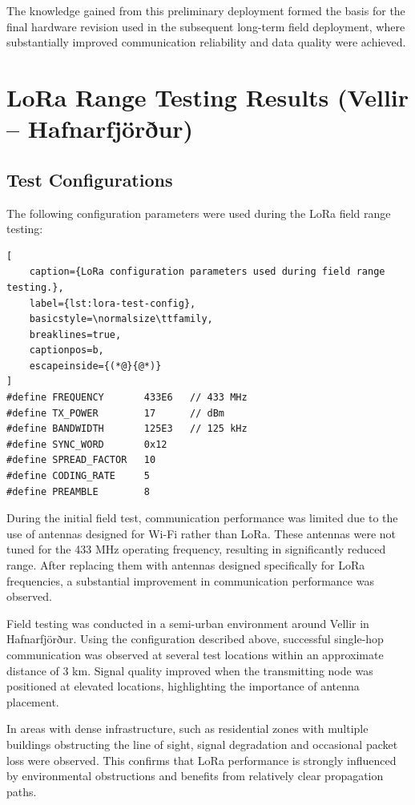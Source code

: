 The knowledge gained from this preliminary deployment formed the basis
for the final hardware revision used in the subsequent long-term field
deployment, where substantially improved communication reliability and
data quality were achieved.

\clearpage
\section{LoRa Range Testing Results (Vellir --
Hafnarfjörður)}\label{sec:lora_range_testing}

\subsection{Test Configurations}

The following configuration parameters were used during the LoRa field
range testing:

\begin{lstlisting}[
    caption={LoRa configuration parameters used during field range testing.},
    label={lst:lora-test-config},
    basicstyle=\normalsize\ttfamily,
    breaklines=true,
    captionpos=b,
    escapeinside={(*@}{@*)}
]
#define FREQUENCY       433E6   // 433 MHz
#define TX_POWER        17      // dBm
#define BANDWIDTH       125E3   // 125 kHz
#define SYNC_WORD       0x12
#define SPREAD_FACTOR   10
#define CODING_RATE     5
#define PREAMBLE        8
\end{lstlisting}

During the initial field test, communication performance was limited due
to the use of antennas designed for Wi-Fi rather than LoRa. These
antennas were not tuned for the 433 MHz operating frequency, resulting
in significantly reduced range. After replacing them with antennas
designed specifically for LoRa frequencies, a substantial improvement in
communication performance was observed.

Field testing was conducted in a semi-urban environment around Vellir in
Hafnarfjörður. Using the configuration described above, successful
single-hop communication was observed at several test locations within an
approximate distance of 3 km. Signal
quality improved when the transmitting node was positioned at elevated
locations, highlighting the importance of antenna placement.

In areas with dense infrastructure, such as residential zones with
multiple buildings obstructing the line of sight, signal degradation and
occasional packet loss were observed. This confirms that LoRa
performance is strongly influenced by environmental obstructions and
benefits from relatively clear propagation paths.

